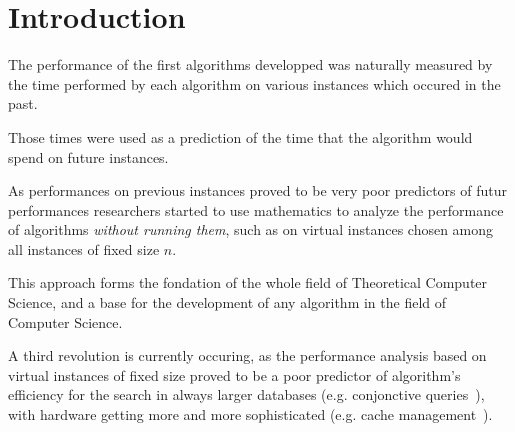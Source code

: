 \chapter{Introduction}
\label{chap:introduction}


The performance of the first algorithms developped was naturally
measured by the time performed by each algorithm on various instances
which occured in the past.
%
\begin{LONG}
  Those times were used as a prediction of the time that the algorithm
  would spend on future instances.
\end{LONG}
%
As performances on previous instances proved to be very poor
predictors of futur performances researchers started to use
mathematics to analyze the performance of algorithms \emph{without
  running them}, such as on virtual instances chosen among all
instances of fixed size $n$.
%
\begin{LONG}
  This approach forms the fondation of the whole field of Theoretical
  Computer Science, and a base for the development of any algorithm in
  the field of Computer Science.
\end{LONG}
%
A third revolution is currently occuring, as the performance analysis
based on virtual instances of fixed size proved to be a poor predictor
of algorithm's efficiency for the search in always larger databases
(e.g. conjonctive queries~\cite{dlm}), with hardware getting more and
more sophisticated (e.g. cache
management~\cite{onTheSeparationAndEquivalenceOfPagingStrategies}).
%

